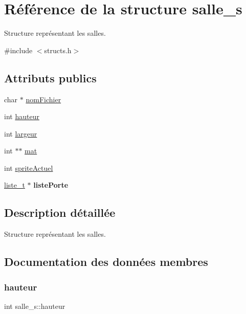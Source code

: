 \hypertarget{structsalle__s}{}\section{Référence de la structure salle\+\_\+s}
\label{structsalle__s}


Structure représentant les salles.  




{\ttfamily \#include $<$structs.\+h$>$}

\subsection*{Attributs publics}
\begin{DoxyCompactItemize}
\item 
char $\ast$ \hyperlink{structsalle__s_a12e47589795f5ed60109cf2b073ec671}{nom\+Fichier}
\item 
int \hyperlink{structsalle__s_a2be13fedfc5f31bc7f02c65af7d95c7a}{hauteur}
\item 
int \hyperlink{structsalle__s_ac1273e8d176620c3b9130d2f1e741315}{largeur}
\item 
int $\ast$$\ast$ \hyperlink{structsalle__s_ad9934630b58b551f8f185dead2006ba6}{mat}
\item 
int \hyperlink{structsalle__s_a0305fc652ff8d07decc455bfc34ea595}{sprite\+Actuel}
\item 
\mbox{\label{structsalle__s_a8c3b513a26b2418863a37bfd91f86b11}} 
\hyperlink{structliste__s}{liste\+\_\+t} $\ast$ {\bfseries liste\+Porte}
\end{DoxyCompactItemize}


\subsection{Description détaillée}
Structure représentant les salles. 

\subsection{Documentation des données membres}
\mbox{\label{structsalle__s_a2be13fedfc5f31bc7f02c65af7d95c7a}} 
\subsubsection{\texorpdfstring{hauteur}{hauteur}}
{\footnotesize\ttfamily int salle\+\_\+s\+::hauteur}

